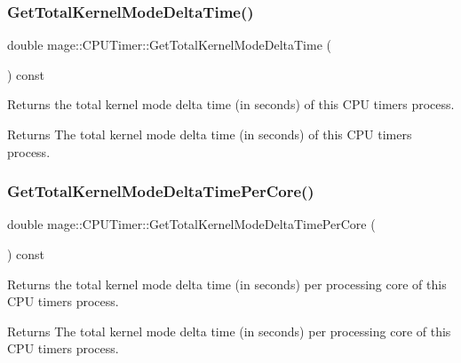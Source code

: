 \subsubsection{\texorpdfstring{Get\+Total\+Kernel\+Mode\+Delta\+Time()}{GetTotalKernelModeDeltaTime()}}
{\footnotesize\ttfamily double mage\+::\+C\+P\+U\+Timer\+::\+Get\+Total\+Kernel\+Mode\+Delta\+Time (\begin{DoxyParamCaption}{ }\end{DoxyParamCaption}) const\hspace{0.3cm}{\ttfamily [noexcept]}}

Returns the total kernel mode delta time (in seconds) of this C\+PU timer\textquotesingle{}s process.

\begin{DoxyReturn}{Returns}
The total kernel mode delta time (in seconds) of this C\+PU timer\textquotesingle{}s process. 
\end{DoxyReturn}
\hypertarget{classmage_1_1_c_p_u_timer_a77ec8684798ab24663645e0f442d1a27}{}\label{classmage_1_1_c_p_u_timer_a77ec8684798ab24663645e0f442d1a27} 
\subsubsection{\texorpdfstring{Get\+Total\+Kernel\+Mode\+Delta\+Time\+Per\+Core()}{GetTotalKernelModeDeltaTimePerCore()}}
{\footnotesize\ttfamily double mage\+::\+C\+P\+U\+Timer\+::\+Get\+Total\+Kernel\+Mode\+Delta\+Time\+Per\+Core (\begin{DoxyParamCaption}{ }\end{DoxyParamCaption}) const\hspace{0.3cm}{\ttfamily [noexcept]}}

Returns the total kernel mode delta time (in seconds) per processing core of this C\+PU timer\textquotesingle{}s process.

\begin{DoxyReturn}{Returns}
The total kernel mode delta time (in seconds) per processing core of this C\+PU timer\textquotesingle{}s process. 
\end{DoxyReturn}
\hypertarget{classmage_1_1_c_p_u_timer_a47b97434d94a954786315d11f8af7983}{}\label{classmage_1_1_c_p_u_timer_a47b97434d94a954786315d11f8af7983} 
